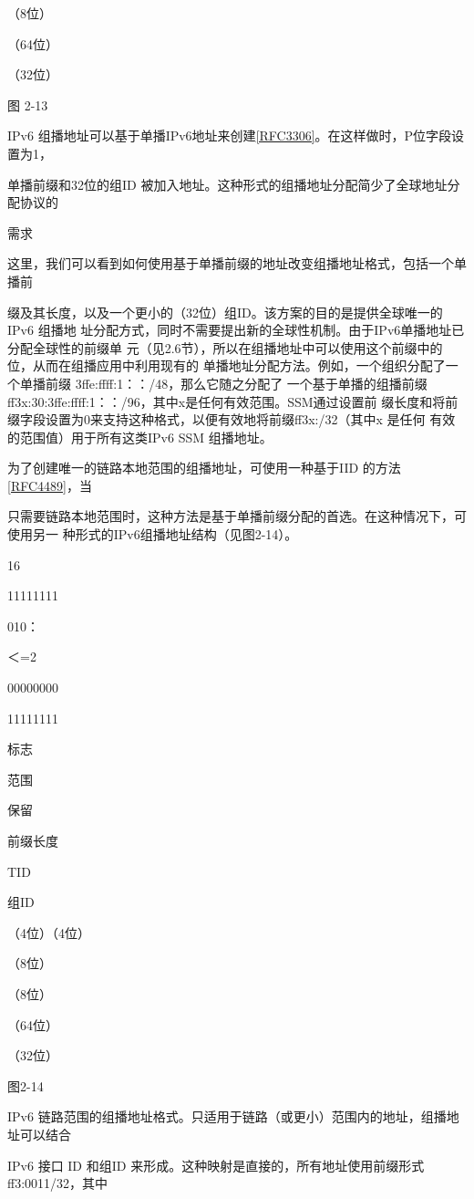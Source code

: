 （8位）

（64位）

（32位）

图 2-13

IPv6 组播地址可以基于单播IPv6地址来创建\href{https://www.rfc-editor.org/rfc/rfc3306}{[RFC3306]}。在这样做时，P位字段设置为1，

单播前缀和32位的组ID 被加入地址。这种形式的组播地址分配简少了全球地址分配协议的

需求

这里，我们可以看到如何使用基于单播前缀的地址改变组播地址格式，包括一个单播前

缀及其长度，以及一个更小的（32位）组ID。该方案的目的是提供全球唯一的IPv6 组播地
址分配方式，同时不需要提出新的全球性机制。由于IPv6单播地址已分配全球性的前缀单
元（见2.6节），所以在组播地址中可以使用这个前缀中的位，从而在组播应用中利用现有的
单播地址分配方法。例如，一个组织分配了一个单播前缀 3ffe:ffff:1：：/48，那么它随之分配了
一个基于单播的组播前缀 ff3x:30:3ffe:ffff:1：：/96，其中x是任何有效范围。SSM通过设置前
缀长度和将前缀字段设置为0来支持这种格式，以便有效地将前缀ff3x:/32（其中x 是任何
有效的范围值）用于所有这类IPv6 SSM 组播地址。

为了创建唯一的链路本地范围的组播地址，可使用一种基于IID 的方法\href{https://www.rfc-editor.org/rfc/rfc4489}{[RFC4489]}，当

只需要链路本地范围时，这种方法是基于单播前缀分配的首选。在这种情况下，可使用另一
种形式的IPv6组播地址结构（见图2-14）。

16

11111111

010：

＜=2

00000000

11111111

标志

范围

保留

前缀长度

TID

组ID

（4位）（4位）

（8位）

（8位）

（64位）

（32位）

图2-14

IPv6 链路范围的组播地址格式。只适用于链路（或更小）范围内的地址，组播地址可以结合

IPv6 接口 ID 和组ID 来形成。这种映射是直接的，所有地址使用前缀形式ff3:0011/32，其中

